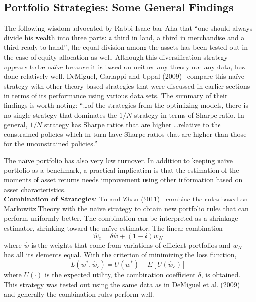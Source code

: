 \subsection{Portfolio Strategies: Some General Findings}



The following wisdom advocated by Rabbi Isaac bar Aha that ``one should always divide his wealth into three parts: a third in land, a third in merchandise and a third ready to hand'', the equal division among the assets has been tested out in the case of equity allocation as well. Although this diversification strategy appears to be na\"ive because it is based on neither any theory nor any data, has done relatively well. DeMiguel, Garlappi and Uppal (2009)~\cite{demig} compare this na\"ive strategy with other theory-based strategies that were discussed in earlier sections in terms of its performance using various data sets. The summary of their findings is worth noting: ``\dots of the strategies from the optimizing models, there is no single strategy that dominates the $1/N$ strategy in terms of Sharpe ratio. In general, $1/N$ strategy has Sharpe ratios that are higher \dots relative to the constrained policies which in turn have Sharpe ratios that are higher than those for the unconstrained policies.''


The na\"ive portfolio has also very low turnover. In addition to keeping na\"ive portfolio as  a benchmark, a practical implication is that the estimation of the moments of asset returns needs improvement using other information based on asset characteristics. \\


\noindent \textbf{Combination of Strategies:} Tu and Zhou (2011)~\cite{jtu} combine the rules based on Markowitz Theory with the na\"ive strategy to obtain new portfolio rules that can perform uniformly better. The combination can be interpreted as a shrinkage estimator, shrinking toward the na\"ive estimator. The linear combination
	\begin{equation}\label{eqn:lincomb}
	\hat{w}_c = \delta \hat{w} + (1-\delta) w_N
	\end{equation}
where $\hat{w}$ is the weights that come from variations of efficient portfolios and $w_N$ has all its elements equal. With the criterion of minimizing the loss function, 
	\begin{equation}\label{eqn:lossfun}
	L(w^*,\hat{w}_c)= U(w^*) - E[U(\hat{w}_c)]
	\end{equation}
where $U(\cdot)$ is the expected utility, the combination coefficient $\delta$, is obtained. This strategy was tested out using the same data as in DeMiguel et al. (2009)~\cite{demig} and generally the combination rules perform well. \\


